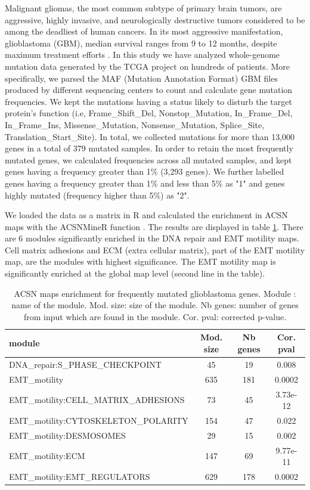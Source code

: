 \documentclass[article]{jss}
\begin{document}
Malignant gliomas, the most common subtype of primary brain tumors, are
aggressive, highly invasive, and neurologically destructive tumors considered
to be among the deadliest of human cancers. In its most aggressive
manifestation, glioblastoma (GBM), median survival ranges from 9 to 12 months,
despite maximum treatment efforts \citep{maher2001malignant}. In this study we
have analyzed whole-genome mutation data generated by the TCGA project on
hundreds of patients. More specifically, we parsed the MAF (Mutation Annotation
Format) GBM files produced by different sequencing centers to count and
calculate gene mutation frequencies. We kept the mutations having a status
likely to disturb the target protein's function (i.e, Frame\_Shift\_Del,
Nonstop\_Mutation, In\_Frame\_Del, In\_Frame\_Ins, Missense\_Mutation,
Nonsense\_Mutation, Splice\_Site, Translation\_Start\_Site). In total, we
collected mutations for more than 13,000 genes in a total of 379 mutated
samples. In order to retain the most frequently mutated genes, we calculated
frequencies across all mutated samples, and kept genes having a frequency
greater than 1\% (3,293 genes). We further labelled genes having a frequency
greater than 1\% and less than 5\% as "1" and genes highly mutated (frequency
higher than 5\%) as "2". 

We loaded the data as a matrix in R and calculated the enrichment in ACSN maps
with the ACSNMineR function . The results are displayed in
table \ref{tab:table_gbm}. There are 6 modules significantly enriched in the
DNA repair and EMT motility maps. Cell matrix adhesions and ECM
(extra cellular matrix), part of the EMT motility map, are the modules with
highest significance. The EMT motility map is significantly enriched at the
global map level (second line in the table). 

\begin{table}[h!]
  \centering
  \caption{ACSN maps enrichment for frequently mutated glioblastoma genes.
  Module : name of the module. Mod. size: size of the module. Nb genes: number
  of genes from input which are found in the module. Cor. pval: corrected
  p-value.} 
  \label{tab:table_gbm}

\begin{tabular}{l|c|c|c}
\hline
module & Mod. size & Nb genes & Cor. pval\\ 
\hline
DNA\_repair:S\_PHASE\_CHECKPOINT &   45 &      19 &     0.008\\
EMT\_motility  &  635  &   181  &   0.0002\\
EMT\_motility:CELL\_MATRIX\_ADHESIONS   &   73  &    45  &    3.73e-12\\
EMT\_motility:CYTOSKELETON\_POLARITY   &   154 &    47  &    0.022\\
EMT\_motility:DESMOSOMES & 29  &    15  &    0.002\\
EMT\_motility:ECM    &    147  &   69   &   9.77e-11\\
EMT\_motility:EMT\_REGULATORS  &   629   &  178  &   0.0002\\
\hline
\end{tabular}
\end{table}
\end{document}
